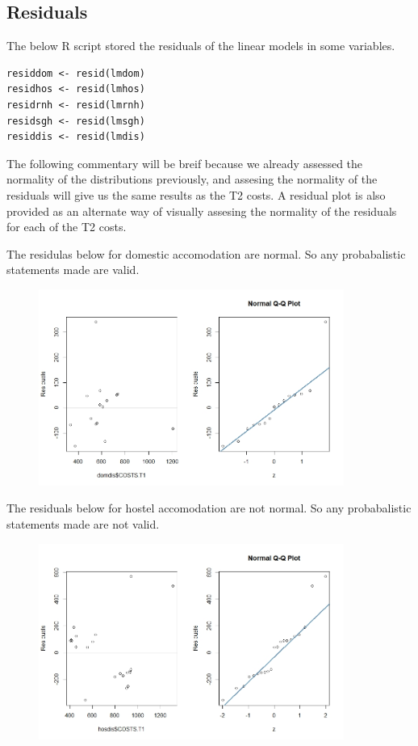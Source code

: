 \documentclass[]{article}
\begin{document}
\subsection{Residuals}
The below R script stored the residuals of the linear models in some variables.
\begin{lstlisting}
residdom <- resid(lmdom)
residhos <- resid(lmhos)
residrnh <- resid(lmrnh)
residsgh <- resid(lmsgh)
residdis <- resid(lmdis)
\end{lstlisting}
\begin{flushleft}
The following commentary will be breif because we already assessed the normality of the distributions previously, and assesing the normality of the residuals will give us the same results as the T2 costs. A residual plot is also provided as an alternate way of visually assesing the normality of the residuals for each of the T2 costs.
\end{flushleft}
The residulas below for domestic accomodation are normal. So any probabalistic statements made are valid.
\begin{figure}[H]
\centering
\includegraphics[width=10cm]{RStudio/jpeg/Res_DOM.jpeg}
\end{figure}
The residuals below for hostel accomodation are not normal. So any probabalistic statements made are not valid.
\begin{figure}[H]
\centering
\includegraphics[width=10cm]{RStudio/jpeg/Res_HOS.jpeg}
\end{figure}
\end{document}
